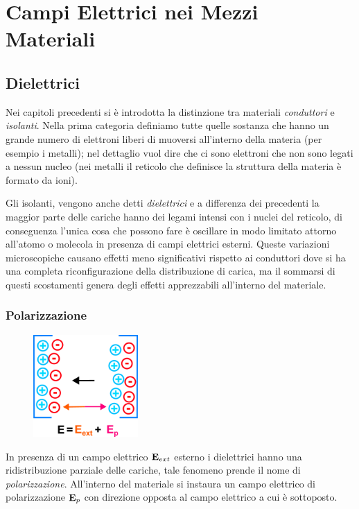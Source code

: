 \setcounter{chapter}{6}
\chapter{Campi Elettrici nei Mezzi Materiali}

\section{Dielettrici}

Nei capitoli precedenti si \`e introdotta la distinzione tra materiali \textit{conduttori} e \textit{isolanti}. Nella prima categoria definiamo tutte quelle sostanza che hanno un grande numero di elettroni liberi di muoversi all'interno della materia (per esempio i metalli); nel dettaglio vuol dire che ci sono elettroni che non sono legati a nessun nucleo (nei metalli il reticolo che definisce la struttura della materia \`e formato da ioni). 

Gli isolanti, vengono anche detti \textit{dielettrici} e a differenza dei precedenti la maggior parte delle cariche  hanno dei legami intensi con i nuclei del reticolo, di conseguenza l'unica cosa che possono fare \`e oscillare in modo limitato attorno all'atomo o molecola in presenza di campi elettrici esterni. Queste variazioni microscopiche causano effetti meno significativi rispetto ai conduttori dove si ha una completa riconfigurazione della distribuzione di carica, ma il sommarsi di questi scostamenti genera degli effetti apprezzabili all'interno del materiale.  


\subsection{Polarizzazione}

\begin{figure}  %
    \centering
    \vspace{-1.2cm}
    \includegraphics[width=4cm]{images/dieletrics}
\end{figure}
In presenza di un campo elettrico $\bold{E}_{ext}$ esterno i dielettrici hanno una ridistribuzione parziale delle cariche, tale fenomeno prende il nome di \textit{polarizzazione}. All'interno del materiale si instaura un campo elettrico di polarizzazione $\bold{E}_{p}$ con direzione opposta al campo elettrico a cui \`e sottoposto. 

